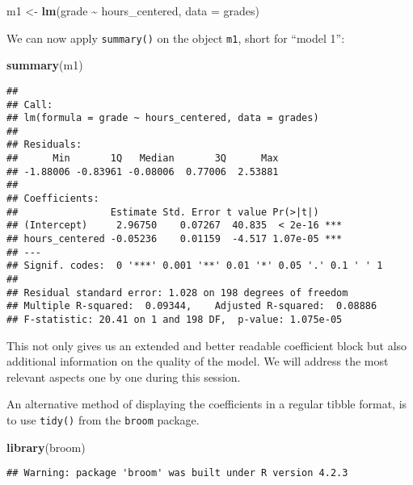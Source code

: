\documentclass[
]{book}
\newenvironment{Shaded}{\begin{snugshade}}{\end{snugshade}}
\newcommand{\AttributeTok}[1]{\textcolor[rgb]{0.13,0.29,0.53}{#1}}
\newcommand{\FunctionTok}[1]{\textcolor[rgb]{0.13,0.29,0.53}{\textbf{#1}}}
\newcommand{\NormalTok}[1]{#1}
\newcommand{\OtherTok}[1]{\textcolor[rgb]{0.56,0.35,0.01}{#1}}
\newcommand{\SpecialCharTok}[1]{\textcolor[rgb]{0.81,0.36,0.00}{\textbf{#1}}}
\begin{document}
\begin{Shaded}
\begin{Highlighting}[]
\NormalTok{m1 }\OtherTok{\textless{}{-}} \FunctionTok{lm}\NormalTok{(grade }\SpecialCharTok{\textasciitilde{}}\NormalTok{ hours\_centered, }\AttributeTok{data =}\NormalTok{ grades)}
\end{Highlighting}
\end{Shaded}

We can now apply \texttt{summary()} on the object \texttt{m1}, short for ``model 1'':

\begin{Shaded}
\begin{Highlighting}[]
\FunctionTok{summary}\NormalTok{(m1)}
\end{Highlighting}
\end{Shaded}

\begin{verbatim}
## 
## Call:
## lm(formula = grade ~ hours_centered, data = grades)
## 
## Residuals:
##      Min       1Q   Median       3Q      Max 
## -1.88006 -0.83961 -0.08006  0.77006  2.53881 
## 
## Coefficients:
##                Estimate Std. Error t value Pr(>|t|)    
## (Intercept)     2.96750    0.07267  40.835  < 2e-16 ***
## hours_centered -0.05236    0.01159  -4.517 1.07e-05 ***
## ---
## Signif. codes:  0 '***' 0.001 '**' 0.01 '*' 0.05 '.' 0.1 ' ' 1
## 
## Residual standard error: 1.028 on 198 degrees of freedom
## Multiple R-squared:  0.09344,    Adjusted R-squared:  0.08886 
## F-statistic: 20.41 on 1 and 198 DF,  p-value: 1.075e-05
\end{verbatim}

This not only gives us an extended and better readable coefficient block but
also additional information on the quality of the model. We will address the
most relevant aspects one by one during this session.

An alternative method of displaying the coefficients in a regular tibble format,
is to use \texttt{tidy()} from the \texttt{broom} package.

\begin{Shaded}
\begin{Highlighting}[]
\FunctionTok{library}\NormalTok{(broom)}
\end{Highlighting}
\end{Shaded}

\begin{verbatim}
## Warning: package 'broom' was built under R version 4.2.3
\end{verbatim}
\end{document}
